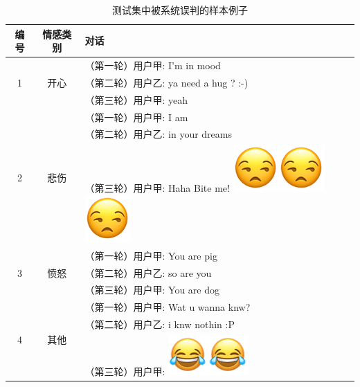 \begin{table}[]
  \centering
  \begin{minipage}[t]{0.7\linewidth}
  \caption{
    \label{tab:semeval_2019_task3_error}
    测试集中被系统误判的样本例子
  }
  \begin{tabularx}{\linewidth}{c|c|l}
  \toprule[1.5pt]

   编号 & 情感类别 & 对话    \\
  \hline
  \multirow{3}{*}{1} & \multirow{3}{*}{开心} 
    &   （第一轮）用户甲: I'm in mood \\
    & & （第二轮）用户乙: ya need a hug ? :-) \\
    & & （第三轮）用户甲: yeah \\
  \hline
  \multirow{3}{*}{2} & \multirow{3}{*}{悲伤} 
    &   （第一轮）用户甲: I am \\
    & & （第二轮）用户乙: in your dreams \\
    & & （第三轮）用户甲: Haha Bite me! \includegraphics[height=1.5\fontcharht\font`\B]{img/emoji/speechless.png}\includegraphics[height=1.5\fontcharht\font`\B]{img/emoji/speechless.png}\includegraphics[height=1.5\fontcharht\font`\B]{img/emoji/speechless.png} \\
  \hline
  \multirow{3}{*}{3} & \multirow{3}{*}{愤怒} 
    &   （第一轮）用户甲: You are pig \\
    & & （第二轮）用户乙: so are you \\
    & & （第三轮）用户甲: You are dog \\
  \hline
  \multirow{3}{*}{4} & \multirow{3}{*}{其他} 
    &   （第一轮）用户甲: Wat u wanna knw? \\
    & & （第二轮）用户乙: i knw nothin :P \\
    & & （第三轮）用户甲: \includegraphics[height=1.5\fontcharht\font`\B]{img/emoji/lol.png}\includegraphics[height=1.5\fontcharht\font`\B]{img/emoji/lol.png} \\

\end{tabularx}
\end{minipage}
\end{table}

